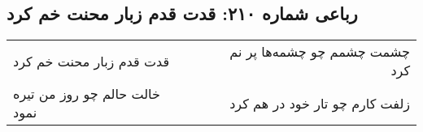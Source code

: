 \begin{center}
\section*{رباعی شماره ۲۱۰: قدت قدم زبار محنت خم کرد}
\label{sec:sh210}
\begin{longtable}{l p{0.5cm} r}
قدت قدم زبار محنت خم کرد
&&
چشمت چشمم چو چشمه‌ها پر نم کرد
\\
خالت حالم چو روز من تیره نمود
&&
زلفت کارم چو تار خود در هم کرد
\\
\end{longtable}
\end{center}
